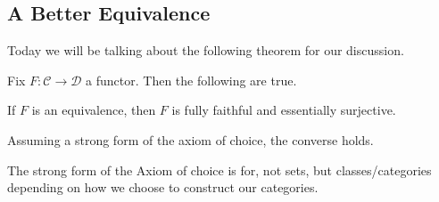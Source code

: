 
\subsection{A Better Equivalence}

Today we will be talking about the following theorem for our discussion.
\begin{theorem} \label{thm:betterequiv}
	Fix $F:\mathcal C\to\mathcal D$ a functor. Then the following are true.
	\begin{listalph}
		\item If $F$ is an equivalence, then $F$ is fully faithful and essentially surjective.
		\item Assuming a strong form of the axiom of choice, the converse holds.
	\end{listalph}
\end{theorem}
\begin{remark}
	The strong form of the Axiom of choice is for, not sets, but classes/categories depending on how we choose to construct our categories.
\end{remark}
